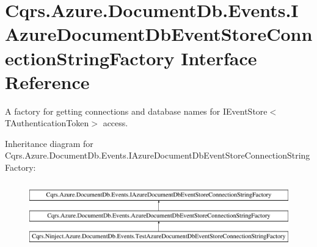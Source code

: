 \hypertarget{interfaceCqrs_1_1Azure_1_1DocumentDb_1_1Events_1_1IAzureDocumentDbEventStoreConnectionStringFactory}{}\section{Cqrs.\+Azure.\+Document\+Db.\+Events.\+I\+Azure\+Document\+Db\+Event\+Store\+Connection\+String\+Factory Interface Reference}
\label{interfaceCqrs_1_1Azure_1_1DocumentDb_1_1Events_1_1IAzureDocumentDbEventStoreConnectionStringFactory}


A factory for getting connections and database names for I\+Event\+Store$<$\+T\+Authentication\+Token$>$ access.  


Inheritance diagram for Cqrs.\+Azure.\+Document\+Db.\+Events.\+I\+Azure\+Document\+Db\+Event\+Store\+Connection\+String\+Factory\+:\begin{figure}[H]
\begin{center}
\leavevmode
\includegraphics[height=2.891566cm]{interfaceCqrs_1_1Azure_1_1DocumentDb_1_1Events_1_1IAzureDocumentDbEventStoreConnectionStringFactory}
\end{center}
\end{figure}
